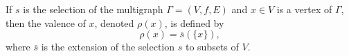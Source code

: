 If $s$ is the selection of the multigraph $\Gamma = (V, f, E)$ and $x \in V$ is a vertex of $\Gamma$, then the valence of $x$, denoted $\rho(x)$, is defined by
$$\rho(x) = \bar{s}(\{x\}),$$
where $\bar{s}$ is the extension of the selection $s$ to subsets of $V$.
